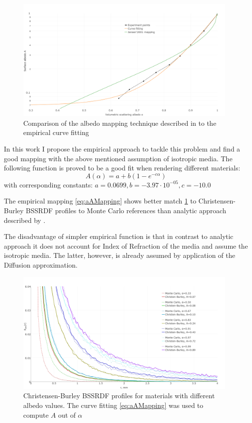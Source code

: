 \begin{figure}
    \centering
    \includegraphics[width=0.98\textwidth]{imgs/plots/aA_fitting_methods}
    \caption{Comparison of the albedo mapping technique described in
    \cite{Jensen:2001:PMS:383259.383319} to the empirical curve fitting}
    \label{fig:albedo_fitting_techniques}
\end{figure}

In this work I propose the empirical approach to tackle this problem and find a good mapping with
the above mentioned assumption of isotropic media. The following function is proved to be a good fit
when rendering different materials:
\begin{equation}
\label{eq:aAMapping}
A(\alpha) = a + b(1- e^{-c\alpha})
\end{equation}
with corresponding constants: $a = 0.0699, b = -3.97\cdot 10^{-05}, c =-10.0$

The empirical mapping \ref{eq:aAMapping} shows better match \ref{fig:albedo_fitting_techniques} to
Christensen-Burley BSSRDF profiles to Monte Carlo references than analytic approach described by
\cite{Jensen:2001:PMS:383259.383319}.

The disadvantage of simpler empirical function is that in contrast to analytic approach it does not
account for Index of Refraction of the media and assume the isotropic media. The latter, however, is
already assumed by application of the Diffusion approximation.

\begin{figure}
    \centering
    \includegraphics[width=0.98\textwidth]{imgs/plots/aA_fitting}
    \caption{Christensen-Burley BSSRDF profiles for materials with different albedo values. The
    curve fitting \ref{eq:aAMapping} was used to compute $A$ out of $\alpha$}
    \label{fig:albedo_fitting}
\end{figure}

